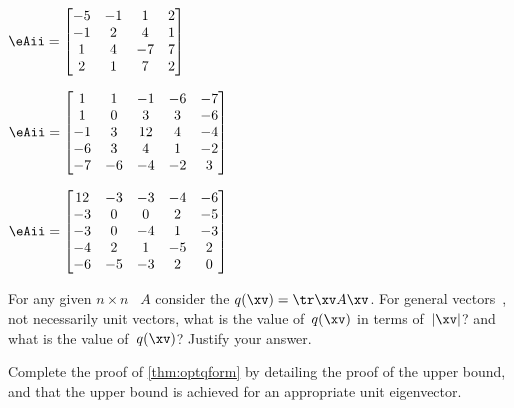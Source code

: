 \begin{exercise}
\begin{Parts}
\begin{reduce}
\item \(\eAii=\begin{bmatrix} -5&-1&1&2
\\-1&2&4&1
\\1&4&-7&7
\\2&1&7&2 \end{bmatrix}\)

\item \(\eAii=\begin{bmatrix} 1&1&-1&-6&-7
\\1&0&3&3&-6
\\-1&3&12&4&-4
\\-6&3&4&1&-2
\\-7&-6&-4&-2&3 \end{bmatrix}\)
\end{reduce}

\item \(\eAii=\begin{bmatrix} 12&-3&-3&-4&-6
\\-3&0&0&2&-5
\\-3&0&-4&1&-3
\\-4&2&1&-5&2
\\-6&-5&-3&2&0 \end{bmatrix}\)


\end{Parts}
\end{exercise}







\begin{exercise}  
For any given \(n\times n\) ~\(A\) consider the  \(q(\xv)=\tr\xv A\xv\). 
For general vectors~\xv, not necessarily unit vectors, what is the  value of~\(q(\xv)\) in terms of~\(|\xv|\)? and what is the  value of~\(q(\xv)\)?  
Justify your answer.
\end{exercise}





\begin{exercise} \label{ex:optqform} 
Complete the proof of \autoref{thm:optqform} by detailing the proof of the upper bound, and that the upper bound is achieved for an appropriate unit eigenvector.
\end{exercise}





